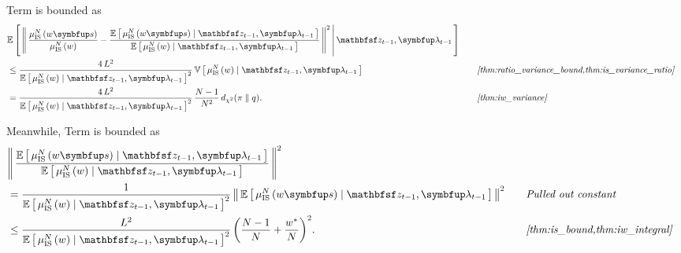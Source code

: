 \begin{proofEnd}
Term  is bounded as
\begin{alignat}{2}
  &\E{
    \norm{
      \frac{\mu^{N}_{\mathrm{IS}}\left(w\vs\right)}{\mu^{N}_{\mathrm{IS}}\left(w\right)}
      -
      \frac{
        \E{ \mu^{N}_{\mathrm{IS}}\left(w\vs\right) \mid \rvvz_{t-1}, \vlambda_{t-1} }
      }{
        \E{ \mu^{N}_{\mathrm{IS}}\left(w\right) \mid \rvvz_{t-1}, \vlambda_{t-1} }
      }
    }^2
    \,\middle|\, \rvvz_{t-1}, \vlambda_{t-1}
  }
  \nonumber
  \\
  &\leq
  \frac{4\,L^2}{\E{ \mu^{N}_{\mathrm{IS}}\left(w\right) \mid \rvvz_{t-1}, \vlambda_{t-1} }^2}
  \,
  \V{
    \mu^{N}_{\mathrm{IS}}\left(w\right)   
    \mid
    \rvvz_{t-1}, \vlambda_{t-1} 
  }
  &&\quad\text{\textit{\cref{thm:ratio_variance_bound,thm:is_variance_ratio}}}
  \nonumber
  \\
  &=
  \frac{4\,L^2}{\E{ \mu^{N}_{\mathrm{IS}}\left(w\right) \mid \rvvz_{t-1}, \vlambda_{t-1} }^2}
  \,
  \frac{N-1}{N^2}\,
  \DChi{\pi}{q}.
  &&\quad\text{\textit{\cref{thm:iw_variance}}}
  \label{eq:mscrb_term1}
\end{alignat}

Meanwhile, Term  is bounded as
\begin{alignat}{2}
  &\norm{
    \frac{
      \E{ \mu^{N}_{\mathrm{IS}}\left(w\vs\right) \mid \rvvz_{t-1}, \vlambda_{t-1} }
    }{
      \E{ \mu^{N}_{\mathrm{IS}}\left(w\right) \mid \rvvz_{t-1}, \vlambda_{t-1} }
    }
  }^2
  \nonumber
  \\
  &=
  \frac{
    1
  }{
    \E{ \mu^{N}_{\mathrm{IS}}\left(w\right) \mid \rvvz_{t-1}, \vlambda_{t-1} }^2
  }\,
  \norm{
    \E{ \mu^{N}_{\mathrm{IS}}\left(w\vs\right) \mid \rvvz_{t-1}, \vlambda_{t-1} }
  }^2
  &&\quad\text{\textit{Pulled out constant}}
  \nonumber
  \\
  &\leq
  \frac{
    L^2
  }{
    \E{ \mu^{N}_{\mathrm{IS}}\left(w\right) \mid \rvvz_{t-1}, \vlambda_{t-1} }^2
  }\,
  {\left(\frac{N - 1}{N} + \frac{w^*}{N}\right)}^2.
  &&\quad\text{\textit{\cref{thm:is_bound,thm:iw_integral}}}
  \label{eq:mscrb_term2}
\end{alignat}


\end{proofEnd}
